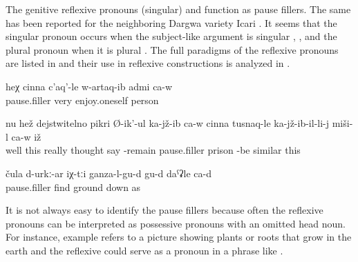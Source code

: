 The genitive reflexive pronouns  (singular) and  function as pause fillers. The same has been reported for the neighboring Dargwa variety Icari \citep[187, fn.~107]{Sumbatova.Mutalov2003}. It seems that the singular pronoun occurs when the subject-like argument is singular , , and the plural pronoun when it is plural . The full paradigms of the reflexive pronouns are listed in  and their use in reflexive constructions is analyzed in .
%
\begin{exe}
	\ex	\label{ex:He is a person that is very extroverted minor@7a}
	\gll	heχ	cinna	c'aq'-le	w-artaq-ib	admi	ca-w\\
			pause.filler	very	enjoy.oneself	person	\\
	\glt	{}

	\ex	\label{ex:‎He is really thinking (or worrying), and sitting, it looks like he is in prison minor}
	\gll	nu	hež	dejstwitelno	pikri	Ø-ik'-ul	ka-jž-ib	ca-w	cinna		tusnaq-le	ka-jž-ib-il-li-j	miši-l	ca-w	iž\\
		well	this	really	thought	say	-remain		pause.filler	prison	-be	similar		this\\
	\glt	{}

	\ex	\label{ex:Well, probably they are like under the ground (growing) minor@7b}
	\gll	čula	d-urkː-ar	iχ-tːi	ganza-l-gu-d	gu-d	daˁʡle	ca-d\\
		pause.filler	find		ground	down	as	\\
	\glt	{}
\end{exe}

It is not always easy to identify the pause fillers because often the reflexive pronouns can be interpreted as possessive pronouns with an omitted head noun. For instance, example  refers to a picture showing plants or roots that grow in the earth and the reflexive  could serve as a pronoun in a phrase like .

